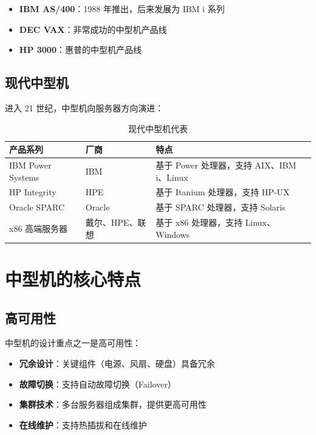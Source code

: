 \documentclass[12pt,UTF8]{ctexbook}
\begin{document}
\begin{itemize}[leftmargin=2cm]
    \item \textbf{IBM AS/400}：1988 年推出，后来发展为 IBM i 系列
    \item \textbf{DEC VAX}：非常成功的中型机产品线
    \item \textbf{HP 3000}：惠普的中型机产品线
\end{itemize}

\section{现代中型机}

进入 21 世纪，中型机向服务器方向演进：

\begin{table}[htbp]
    \centering
    \caption{现代中型机代表}
    \begin{tabular}{|p{3cm}|p{3cm}|p{4cm}|}
        \hline
        \textbf{产品系列} & \textbf{厂商} & \textbf{特点} \\
        \hline
        IBM Power Systems & IBM & 基于 Power 处理器，支持 AIX、IBM i、Linux \\
        \hline
        HP Integrity & HPE & 基于 Itanium 处理器，支持 HP-UX \\
        \hline
        Oracle SPARC & Oracle & 基于 SPARC 处理器，支持 Solaris \\
        \hline
        x86 高端服务器 & 戴尔、HPE、联想 & 基于 x86 处理器，支持 Linux、Windows \\
        \hline
    \end{tabular}
\end{table}

\chapter{中型机的核心特点}
\label{chap:features}

\section{高可用性}

中型机的设计重点之一是高可用性：

\begin{itemize}[leftmargin=2cm]
    \item \textbf{冗余设计}：关键组件（电源、风扇、硬盘）具备冗余
    \item \textbf{故障切换}：支持自动故障切换（Failover）
    \item \textbf{集群技术}：多台服务器组成集群，提供更高可用性
    \item \textbf{在线维护}：支持热插拔和在线维护
\end{itemize}
\end{document}
